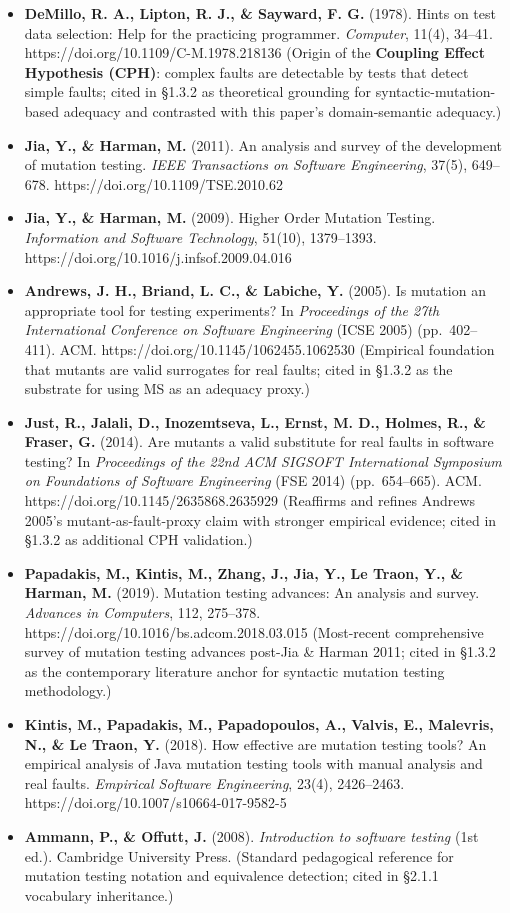 \documentclass[review,12pt,authoryear]{elsarticle}
\providecommand{\tightlist}{\setlength{\itemsep}{0pt}\setlength{\parskip}{0pt}}
\begin{document}
\begin{itemize}
\tightlist
\item
  \textbf{DeMillo, R. A., Lipton, R. J., \& Sayward, F. G.} (1978).
  Hints on test data selection: Help for the practicing programmer.
  \emph{Computer}, 11(4), 34--41.
  https://doi.org/10.1109/C-M.1978.218136 (Origin of the
  \textbf{Coupling Effect Hypothesis (CPH)}: complex faults are
  detectable by tests that detect simple faults; cited in §1.3.2 as
  theoretical grounding for syntactic-mutation-based adequacy and
  contrasted with this paper's domain-semantic adequacy.)
\item
  \textbf{Jia, Y., \& Harman, M.} (2011). An analysis and survey of the
  development of mutation testing. \emph{IEEE Transactions on Software
  Engineering}, 37(5), 649--678. https://doi.org/10.1109/TSE.2010.62
\item
  \textbf{Jia, Y., \& Harman, M.} (2009). Higher Order Mutation Testing.
  \emph{Information and Software Technology}, 51(10), 1379--1393.
  https://doi.org/10.1016/j.infsof.2009.04.016
\item
  \textbf{Andrews, J. H., Briand, L. C., \& Labiche, Y.} (2005). Is
  mutation an appropriate tool for testing experiments? In
  \emph{Proceedings of the 27th International Conference on Software
  Engineering} (ICSE 2005) (pp.~402--411). ACM.
  https://doi.org/10.1145/1062455.1062530 (Empirical foundation that
  mutants are valid surrogates for real faults; cited in §1.3.2 as the
  substrate for using MS as an adequacy proxy.)
\item
  \textbf{Just, R., Jalali, D., Inozemtseva, L., Ernst, M. D., Holmes,
  R., \& Fraser, G.} (2014). Are mutants a valid substitute for real
  faults in software testing? In \emph{Proceedings of the 22nd ACM
  SIGSOFT International Symposium on Foundations of Software
  Engineering} (FSE 2014) (pp.~654--665). ACM.
  https://doi.org/10.1145/2635868.2635929 (Reaffirms and refines Andrews
  2005's mutant-as-fault-proxy claim with stronger empirical evidence;
  cited in §1.3.2 as additional CPH validation.)
\item
  \textbf{Papadakis, M., Kintis, M., Zhang, J., Jia, Y., Le Traon, Y.,
  \& Harman, M.} (2019). Mutation testing advances: An analysis and
  survey. \emph{Advances in Computers}, 112, 275--378.
  https://doi.org/10.1016/bs.adcom.2018.03.015 (Most-recent
  comprehensive survey of mutation testing advances post-Jia \& Harman
  2011; cited in §1.3.2 as the contemporary literature anchor for
  syntactic mutation testing methodology.)
\item
  \textbf{Kintis, M., Papadakis, M., Papadopoulos, A., Valvis, E.,
  Malevris, N., \& Le Traon, Y.} (2018). How effective are mutation
  testing tools? An empirical analysis of Java mutation testing tools
  with manual analysis and real faults. \emph{Empirical Software
  Engineering}, 23(4), 2426--2463.
  https://doi.org/10.1007/s10664-017-9582-5
\item
  \textbf{Ammann, P., \& Offutt, J.} (2008). \emph{Introduction to
  software testing} (1st ed.). Cambridge University Press. (Standard
  pedagogical reference for mutation testing notation and equivalence
  detection; cited in §2.1.1 vocabulary inheritance.)
\end{itemize}
\end{document}
